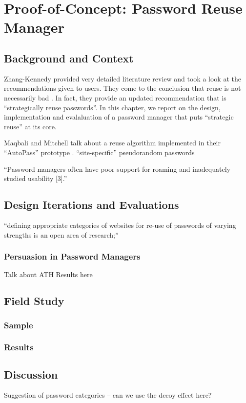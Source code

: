\chapter[Proof-of-Concept: Password Reuse Manager]{Proof-of-Concept: Password Reuse Manager}\label{chap:pwrm}

\section{Background and Context}

Zhang-Kennedy \etal provided very detailed literature review and took a look at the recommendations given to users. They come to the conclusion that reuse is not necessarily bad \cite[p.8-9]{ZhangKennedy2016RevisitingPasswordRules}. In fact, they provide an updated recommendation that is ``strategically reuse passwords''. In this chapter, we report on the design, implementation and evalaluation of a password manager that puts ``strategic reuse'' at its core. 


Maqbali and Mitchell talk about a reuse algorithm implemented in their ``AutoPass'' prototype \cite{Maqbali2016PasswordGenerators}.
``site-specific'' pseudorandom passwords

``Password managers often have poor support for roaming and inadequately studied usability [3].'' \cite{Herley2012PersistenceOfPasswords}

\section{Design Iterations and Evaluations}

``defining appropriate categories of websites for re-use of passwords of varying strengths is an open area of research;'' \cite{Wash2016UnderstandingPasswordChoices} 

\subsection{Persuasion in Password Managers}
Talk about ATH Results here


\section{Field Study}
\subsection{Sample}
\subsection{Results}



\section{Discussion}
Suggestion of password categories -- can we use the decoy effect here?
